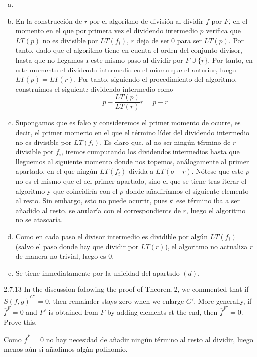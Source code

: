 \documentclass[twoside]{article}
\begin{document}
\begin{solucion}
\begin{enumerate}[a.]
\item[]
\item En la construcción de $r$ por el algoritmo de división al dividir $f$ por $F$, en el momento en el que por primera vez el dividendo intermedio $p$ verifica que $LT(p)$ no es divisible por $LT(f_i)$, $r$ deja de ser $0$ para ser $LT(p)$.  Por tanto, dado que el algoritmo tiene en cuenta el orden del conjunto divisor, hasta que no llegamos a este mismo paso al dividir por $F\cup\{r\}$. Por tanto, en este momento el dividendo intermedio es el mismo que el anterior, luego $LT(p)=LT(r)$. Por tanto, siguiendo el procedimiento del algoritmo, construimos el siguiente dividendo intermedio como 
$$
p-\frac{LT(p)}{LT(r)}r=p-r
$$
\item Supongamos que es falso y consideremos el primer momento de ocurre, es decir, el primer momento en el que el término líder del dividendo intermedio no es divisible por $LT(f_i)$. Es claro que, al no ser ningún término de $r$ divisible por $f_i$, iremos cumputando los dividendos intermedios hasta que lleguemos al siguiente momento donde nos topemos, análogamente al primer apartado, en el que ningún $LT(f_i)$ divida a $LT(p-r)$. Nótese que este $p$ no es el mismo que el del primer apartado, sino el que se tiene tras iterar el algoritmo y que coincidiría con el $p$ donde añadiríamos el siguiente elemento al resto. Sin embargo, esto no puede ocurrir, pues si ese término iba a ser añadido al resto, se anularía con el correspondiente de $r$, luego el algoritmo no se atascaría.
\item Como en cada paso el divisor intermedio es dividible por algún $LT(f_i)$ (salvo el paso donde hay que dividir por $LT(r)$), el algoritmo no actualiza $r$ de manera no trivial, luego es $0$.
\item Se tiene inmediatamente por la unicidad del apartado $(d)$.
\end{enumerate}
\end{solucion}

\newpage

\begin{ejercicio}{2.7.13}
In the discussion following the proof of Theorem 2, we commented that if $\overline{S( f , g)}^{G'} = 0$,
then remainder stays zero when we enlarge $G'$. More generally, if $\overline{f}^F = 0$ and $F'$ is
obtained from $F$ by adding elements at the end, then $\overline{f}^{F'} = 0$. Prove this.
\end{ejercicio}
\begin{solucion}
Como $\overline{f}^F = 0$ no hay necesidad de añadir ningún término al resto al dividir, luego menos aún si añadimos algún polinomio.
\end{solucion}
\end{document}
